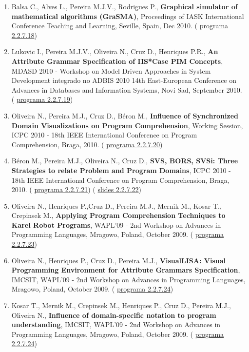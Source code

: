 \documentclass[11pt]{article}
\begin{document}
\begin{enumerate}
\item{Balsa C., Alves L., Pereira M.J.V., Rodrigues P., {
\bf{ Graphical simulator of mathematical algorithms (GraSMA)}}, Proceedings of IASK International Conference Teaching and Learning, Seville, Spain, Dec 2010. (
\href{run:ComunicacoesOrais/programas/IASK2010prog.pdf}{programa 2.2.7.18})}
\item{Lukovic I., Pereira M.J.V., Oliveira N., Cruz D., Henriques P.R., {
\bf{ An Attribute Grammar Specification of IIS*Case PIM Concepts}}, MDASD 2010 - Workshop on Model Driven Approaches in System Development integrado no ADBIS 2010 14th East-European Conference on Advances in Databases and Information Systems, Novi Sad, September 2010. (
\href{run:ComunicacoesOrais/programas/adbis2010prog.pdf}{programa 2.2.7.19})}
\item{Oliveira N., Pereira M.J., Cruz D., Béron M., {
\bf{ Influence of Synchronized Domain Visualizations on Program Comprehension}}, Working Session, ICPC 2010 - 18th IEEE International Conference on Program Comprehension, Braga, 2010. (
\href{run:ComunicacoesOrais/programas/ICPC2010.pdf}{programa 2.2.7.20})}
\item{Béron M., Pereira M.J., Oliveira N., Cruz D., {
\bf{ SVS, BORS, SVSi: Three Strategies to relate Problem and Program Domains}}, ICPC 2010 - 18th IEEE International Conference on Program Comprehension, Braga, 2010. (
\href{run:ComunicacoesOrais/programas/ICPC2010.pdf}{programa 2.2.7.21}) (
\href{run:ComunicacoesOrais/ICPC10apres.pdf}{slides 2.2.7.22})}
\item{Oliveira N., Henriques P.,Cruz D., Pereira M.J., Mernik M., Kosar T., Crepinsek M., {
\bf{ Applying Program Comprehension Techniques to Karel Robot Programs}}, WAPL'09 - 2nd Workshop on Advances in Programming Languages, Mragowo, Poland, October 2009. (
\href{run:ComunicacoesOrais/programas/WAPL2009.pdf}{programa 2.2.7.23})}
\item{Oliveira N., Henriques P., Cruz D., Pereira M.J., {
\bf{ VisualLISA: Visual Programming Environment for Attribute Grammars Specification}}, IMCSIT, WAPL'09 - 2nd Workshop on Advances in Programming Languages, Mragowo, Poland, October 2009. (
\href{run:ComunicacoesOrais/programas/WAPL2009.pdf}{programa 2.2.7.24})}
\item{Kosar T., Mernik M., Crepinsek M., Henriques P., Cruz D., Pereira M.J., Oliveira N., {
\bf{ Influence of domain-specific notation to program understanding}}, IMCSIT, WAPL'09 - 2nd Workshop on Advances in Programming Languages, Mragowo, Poland, October 2009. (
\href{run:ComunicacoesOrais/programas/WAPL2009.pdf}{programa 2.2.7.24})}

\end{enumerate}
\end{document}
